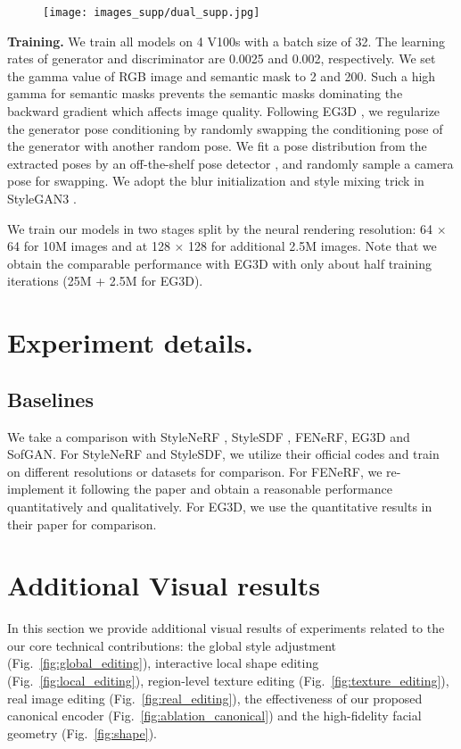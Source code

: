\documentclass[acmtog]{acmart}
\begin{document}
\begin{figure}[b]
  \centering
  \texttt{[image: images\_supp/dual\_supp.jpg]}
  \caption{}
  \Description{}
  \label{fig:dual}
\end{figure}


\noindent \textbf{Training.} We train all models on 4 V100s with a batch size of 32. The learning rates of generator and discriminator are 0.0025 and 0.002, respectively. We set the gamma value of RGB image and semantic mask to 2 and 200. Such a high gamma for semantic masks prevents the semantic masks dominating the backward gradient which affects image quality. Following EG3D \cite{eg3d}, we regularize the generator pose conditioning by randomly swapping the conditioning pose of the generator with another random pose. We fit a pose distribution from the extracted poses by an off-the-shelf pose detector \cite{deng2019accurate}, and randomly sample a camera pose for swapping. We adopt the blur initialization and style mixing trick in StyleGAN3 \cite{karras2021alias}. 

We train our models in two stages split by the neural rendering resolution: 64 $\times$ 64 for 10M images and at 128 $\times$ 128 for additional 2.5M images. Note that we obtain the comparable performance with EG3D with only about half training iterations (25M + 2.5M for EG3D). 

\section{Experiment details.} 
\label{sec:2}

\subsection{Baselines}

We take a comparison with StyleNeRF \cite{gu2021stylenerf}, StyleSDF \cite{orel2021stylesdf}, FENeRF\cite{sun2021fenerf}, EG3D\cite{eg3d} and SofGAN\cite{chen2020sofgan}. For StyleNeRF and StyleSDF, we utilize their official codes and train on different resolutions or datasets for comparison. For FENeRF, we re-implement it following the paper and obtain a reasonable performance quantitatively and qualitatively. For EG3D,  we use the quantitative results in their paper for comparison. 

\section{Additional Visual results}
\label{sec:3}
In this section we provide additional visual results of experiments related to the our core technical contributions: the global style adjustment (Fig.~\ref{fig:global_editing}), interactive local shape editing (Fig.~\ref{fig:local_editing}), region-level texture editing (Fig.~\ref{fig:texture_editing}), real image editing (Fig.~\ref{fig:real_editing}), the effectiveness of our proposed canonical encoder (Fig.~\ref{fig:ablation_canonical}) and the high-fidelity facial geometry (Fig.~\ref{fig:shape}).
\end{document}
